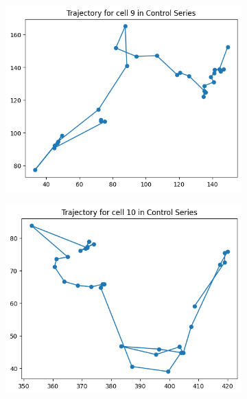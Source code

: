 \documentclass{article}
\begin{document}
\begin{figure}[h!]
    \centering
    \begin{subfigure}[b]{0.5\linewidth}
        \centering
        \includegraphics[width=\linewidth]{Report/Appendix_Images/Trajectory-A-Control/trajectory_9.png}
    \end{subfigure}%
    \begin{subfigure}[b]{0.5\linewidth}
        \centering
        \includegraphics[width=\linewidth]{Report/Appendix_Images/Trajectory-A-Control/trajectory_10.png}
    \end{subfigure}
    \begin{subfigure}[b]{0.5\linewidth}

\end{subfigure}
\end{figure}
\end{document}
